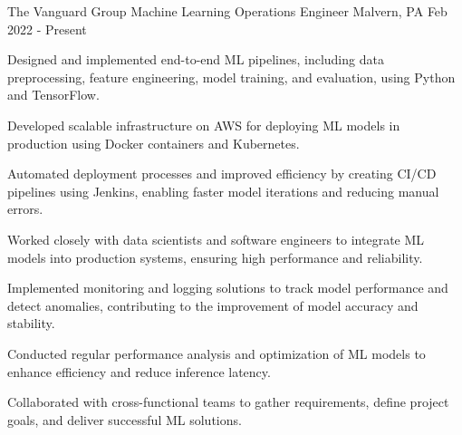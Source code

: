 


\begin{cventries}

\cventry
{The Vanguard Group} %
{Machine Learning Operations Engineer} %
{Malvern, PA} %
{Feb 2022 - Present} %
{ %
\begin{cvitems}
\item Designed and implemented end-to-end ML pipelines, including data preprocessing, feature engineering, model training, and evaluation, using Python and TensorFlow.
\item Developed scalable infrastructure on AWS for deploying ML models in production using Docker containers and Kubernetes.
\item Automated deployment processes and improved efficiency by creating CI/CD pipelines using Jenkins, enabling faster model iterations and reducing manual errors.
\item Worked closely with data scientists and software engineers to integrate ML models into production systems, ensuring high performance and reliability.
\item Implemented monitoring and logging solutions to track model performance and detect anomalies, contributing to the improvement of model accuracy and stability.
\item Conducted regular performance analysis and optimization of ML models to enhance efficiency and reduce inference latency.
\item Collaborated with cross-functional teams to gather requirements, define project goals, and deliver successful ML solutions.
\end{cvitems}
}


\end{cventries}
